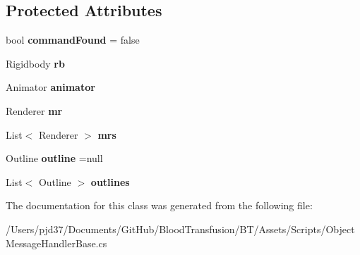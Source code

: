 \subsection*{Protected Attributes}
\begin{DoxyCompactItemize}
\item 
bool {\bfseries command\+Found} = false\hypertarget{class_object_message_handler_base_a52056214167a7984ec982d047560f5b9}{}\label{class_object_message_handler_base_a52056214167a7984ec982d047560f5b9}

\item 
Rigidbody {\bfseries rb}\hypertarget{class_object_message_handler_base_aea111ae4c6541f7b13ae02d902ba59d7}{}\label{class_object_message_handler_base_aea111ae4c6541f7b13ae02d902ba59d7}

\item 
Animator {\bfseries animator}\hypertarget{class_object_message_handler_base_a267074d085af7b96c9c7eacd18fba074}{}\label{class_object_message_handler_base_a267074d085af7b96c9c7eacd18fba074}

\item 
Renderer {\bfseries mr}\hypertarget{class_object_message_handler_base_a19036768dce549f20c1bbc32f38363b6}{}\label{class_object_message_handler_base_a19036768dce549f20c1bbc32f38363b6}

\item 
List$<$ Renderer $>$ {\bfseries mrs}\hypertarget{class_object_message_handler_base_ace27c3cc258ea2b0187b7b36ad1b0156}{}\label{class_object_message_handler_base_ace27c3cc258ea2b0187b7b36ad1b0156}

\item 
Outline {\bfseries outline} =null\hypertarget{class_object_message_handler_base_ae9fa4fd980267754bdb712de3437f770}{}\label{class_object_message_handler_base_ae9fa4fd980267754bdb712de3437f770}

\item 
List$<$ Outline $>$ {\bfseries outlines}\hypertarget{class_object_message_handler_base_a7a2a4001c4e876bbc272128b428d58e3}{}\label{class_object_message_handler_base_a7a2a4001c4e876bbc272128b428d58e3}

\end{DoxyCompactItemize}


The documentation for this class was generated from the following file\+:\begin{DoxyCompactItemize}
\item 
/\+Users/pjd37/\+Documents/\+Git\+Hub/\+Blood\+Transfusion/\+B\+T/\+Assets/\+Scripts/Object\+Message\+Handler\+Base.\+cs\end{DoxyCompactItemize}
